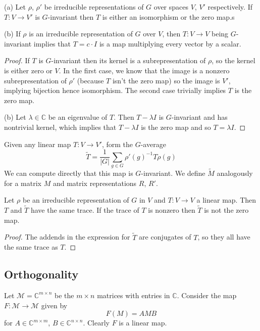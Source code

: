 \documentclass[10pt]{scrartcl}
\providecommand{\CC}{\mathbb C}
\providecommand{\inv}{^{-1}}
\begin{document}
\begin{lemma}[Schur]
	(a) Let $\rho$, $\rho'$ be irreducible representations of $G$
	over spaces $V$, $V'$ respectively. If $T\colon V\to V'$
	is $G$-invariant then $T$ is either an isomorphism or the zero map.s
	
	(b) If $\rho$ is an irreducible representation of $G$ over $V$,
	then $T\colon V\to V$ being $G$-invariant implies that
	$T = c\cdot I$ is a map multiplying every vector by a scalar.
\end{lemma}

\begin{proof}
	If $T$ is $G$-invariant then its kernel is a subrepresentation of $\rho$,
	so the kernel is either zero or $V$. In the first case,
	we know that the image is a nonzero subrepresentation of $\rho'$
	(because $T$ isn't the zero map) so the image is $V'$,
	implying bijection hence isomorphism.
	The second case trivially implies $T$ is the zero map.
	
	(b) Let $\lambda\in\CC$ be an eigenvalue of $T$.
	Then $T-\lambda I$ is $G$-invariant and has nontrivial kernel,
	which implies that $T-\lambda I$ is the zero map and so $T = \lambda I$.
\end{proof}

Given any linear map $T\colon V\to V'$, form the $G$-average
\[\tilde T = \frac1{|G|}\sum_{g\in G}\rho'(g)\inv T\rho(g)\]
We can compute directly that this map is $G$-invariant. 
We define $\tilde M$ analogously for a matrix $M$
and matrix representations $R$, $R'$.

\begin{prop}
	Let $\rho$ be an irreducible representation of $G$ in $V$
	and $T\colon V\to V$ a linear map. Then $T$ and $\tilde T$
	have the same trace. If the trace of $T$ is nonzero then $\tilde T$
	is not the zero map.
\end{prop}

\begin{proof}
	The addends in the expression for $\tilde T$ are conjugates of $T$,
	so they all have the same trace as $T$.
\end{proof}

\subsection{Orthogonality}
Let $\mathcal M = \CC^{m\times n}$ be the $m\times n$ matrices
with entries in $\CC$. Consider the map $F\colon \mathcal M\to\mathcal M$
given by
\[F(M) = AMB\]
for $A\in\CC^{m\times m}$, $B\in\CC^{n\times n}$.
Clearly $F$ is a linear map.
\end{document}
